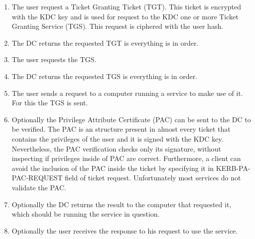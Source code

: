 \begin{enumerate}
	\item The user request a Ticket Granting Ticket (TGT). This ticket is encrypted with the KDC key and is used for request to the KDC one or more Ticket Granting Service (TGS). This request is ciphered with the user hash.
	\item The DC returns the requested TGT is everything is in order.
	\item The user requests the TGS.
	\item The DC returns the requested TGS is everything is in order.
	\item The user sends a request to a computer running a service to make use of it. For this the TGS is sent.
	\item Optionally the Privilege Attribute Certificate (PAC) can be sent to the DC to be verified. The PAC is an structure present in almost every ticket that contains the privileges of the user and it is signed with the KDC key. Nevertheless, the PAC verification checks only its signature, without inspecting if privileges inside of PAC are correct. Furthermore, a client can avoid the inclusion of the PAC inside the ticket by specifying it in KERB-PA-PAC-REQUEST field of ticket request. Unfortunately most services do not validate the PAC.
	\item Optionally the DC returns the result to the computer that requested it, which should be running the service in question.
	\item Optionally the user receives the response to his request to use the service.
\end{enumerate}

